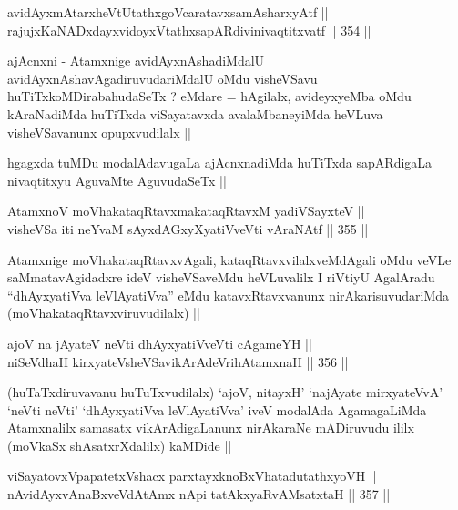 \begin{shl}
avidAyxmAtarxheVtUtathxgoVcaratavxsamAsharxyAtf || \\
rajujxKaNADxdayxvidoyxVtathxsapARdivinivaqtitxvatf ||  354 ||  
\end{shl}

\begin{artha}
ajAcnxni - Atamxnige avidAyxnAshadiMdalU
avidAyxnAshavAgadiruvudariMdalU oMdu visheVSavu
huTiTxkoMDirabahudaSeTx ? eMdare = hAgilalx, avideyxyeMba oMdu
kAraNadiMda huTiTxda viSayatavxda avalaMbaneyiMda heVLuva
visheVSavanunx opupxvudilalx ||
\end{artha}

\begin{artha}
hgagxda tuMDu modalAdavugaLa ajAcnxnadiMda huTiTxda sapARdigaLa
nivaqtitxyu AguvaMte AguvudaSeTx ||
\end{artha}


\begin{shl}
AtamxnoV moVhakataqRtavxmakataqRtavxM yadiVSayxteV || \\
visheVSa iti neYvaM sAyxdAGxyXyatiVveVti vAraNAtf ||  355 ||  
\end{shl}

\begin{artha}
Atamxnige moVhakataqRtavxvAgali, kataqRtavxvilalxveMdAgali oMdu veVLe
saMmatavAgidadxre ideV visheVSaveMdu heVLuvalilx I riVtiyU AgalAradu
``dhAyxyatiVva leVlAyatiVva'' eMdu katavxRtavxvanunx
nirAkarisuvudariMda (moVhakataqRtavxviruvudilalx) ||
\end{artha}


\begin{shl}
ajoV na jAyateV neVti dhAyxyatiVveVti cA\s \s gameYH || \\
niSeVdhaH kirxyateV\s sheVSavikArAdeVrihA\s \s tamxnaH ||  356 ||  
\end{shl}

\begin{artha}
(huTaTxdiruvavanu huTuTxvudilalx) `ajoV, nitayxH' `najAyate
  mirxyateVvA' `neVti neVti' `dhAyxyatiVva leVlAyatiVva' iveV modalAda
  AgamagaLiMda Atamxnalilx samasatx vikArAdigaLanunx nirAkaraNe
  mADiruvudu ililx (moVkaSx shAsatxrXdalilx) kaMDide ||
\end{artha}

\begin{shl}
viSayatovxVpapatetxVshacx parxtayxknoBxVhatadutathxyoVH ||  \\
nAvidAyxvAnaBxveVdAtAmx nApi tatAkxyaRvAMsatxtaH ||  357 ||  
\end{shl}

